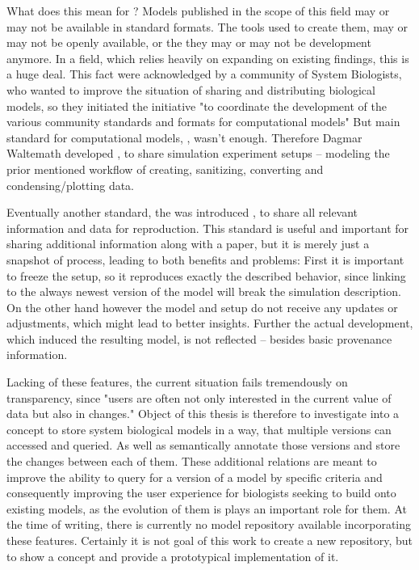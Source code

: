 What does this mean for \sysbio? Models published in the scope of this field may or may not be available in standard formats. The tools used to create them, may or may not be openly available, or the they may or may not be development anymore. \cite{Peng2011}
In a field, which relies heavily on expanding on existing findings, this is a huge deal.
This fact were acknowledged by a community of System Biologists, who wanted to improve the situation of sharing and distributing biological models, so they initiated the \combine initiative "to coordinate the development of the various community standards and formats for computational models" \cite{COMBINE}
But main standard for computational models, \sbml, wasn't enough. Therefore Dagmar Waltemath developed \sedml \cite{Kohn2008}, to share simulation experiment setups -- modeling the prior mentioned workflow of creating, sanitizing, converting and condensing/plotting data.

Eventually another standard, the \ca was introduced \cite{Bergmann2014a}, to share all relevant information and data for reproduction. This standard is useful and important for sharing additional information along with a paper, but it is merely just a snapshot of process, leading to both benefits and problems: First it is important to freeze the setup, so it reproduces exactly the described behavior, since linking to the always newest version of the model will break the simulation description. On the other hand however the model and setup do not receive any updates or adjustments, which might lead to better insights. Further the actual development, which induced the resulting model, is not reflected -- besides basic provenance information.

Lacking of these features, the current situation fails tremendously on transparency, since "users are often not only interested in the current value of data but also in changes." \cite{Cobena2002}
Object of this thesis is therefore to investigate into a concept to store system biological models in a way, that multiple versions can accessed and queried. As well as semantically annotate those versions and store the changes between each of them. These additional relations are meant to improve the ability to query for a version of a model by specific criteria and consequently improving the user experience for biologists seeking to build onto existing models, as the evolution of them is plays an important role for them. \cite{Scharm2015}
At the time of writing, there is currently no model repository available incorporating these features. Certainly it is not goal of this work to create a new repository, but to show a concept and provide a prototypical implementation of it.

